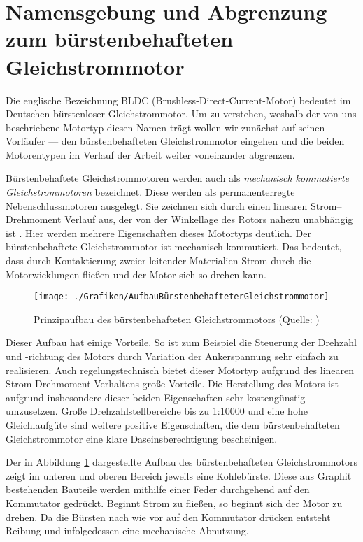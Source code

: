\section{Namensgebung und Abgrenzung zum bürstenbehafteten Gleichstrommotor}

Die englische Bezeichnung \glqq{}BLDC\grqq{} (Brushless-Direct-Current-Motor) bedeutet im Deutschen \glqq{}bürstenloser Gleichstrommotor\grqq{}. Um zu verstehen, weshalb der von uns beschriebene Motortyp diesen Namen trägt wollen wir zunächst auf seinen Vorläufer --- den bürstenbehafteten Gleichstrommotor eingehen und die beiden Motorentypen im Verlauf der Arbeit weiter voneinander abgrenzen.

Bürstenbehaftete Gleichstrommotoren werden auch als \emph{mechanisch kommutierte Gleichstrommotoren} bezeichnet. Diese \glqq{}werden als permanenterregte Nebenschlussmotoren ausgelegt. Sie zeichnen sich durch einen linearen Strom–Drehmoment Verlauf aus, der von der Winkellage des Rotors nahezu unabhängig ist\grqq{} \parencite[S.51]{Probst2011}. Hier werden mehrere Eigenschaften dieses Motortyps deutlich. Der bürstenbehaftete Gleichstrommotor ist mechanisch kommutiert. Das bedeutet, dass durch Kontaktierung zweier leitender Materialien Strom durch die Motorwicklungen fließen und der Motor sich so drehen kann.

\begin{figure}[H]
  \centering
  \texttt{[image: ./Grafiken/AufbauBürstenbehafteterGleichstrommotor]}
  \caption[Aufbau bürstenbehafteter Gleichstrommotor]{Prinzipaufbau des bürstenbehafteten Gleichstrommotors (Quelle: \parencite[S.51]{Probst2011})}
  \label{fig:AufbauBürstenbehaftet}
\end{figure}

Dieser Aufbau hat einige Vorteile. So ist zum Beispiel die Steuerung der Drehzahl und -richtung des Motors durch Variation der Ankerspannung sehr einfach zu realisieren. Auch regelungstechnisch bietet dieser Motortyp aufgrund des linearen Strom-Drehmoment-Verhaltens große Vorteile. Die Herstellung des Motors ist aufgrund insbesondere dieser beiden Eigenschaften sehr kostengünstig umzusetzen. \glqq{}Große Drehzahlstellbereiche bis zu 1:10000 und eine hohe Gleichlaufgüte\grqq{} \parencite[S.51]{Probst2011} sind weitere positive Eigenschaften, die dem bürstenbehafteten Gleichstrommotor eine klare Daseinsberechtigung bescheinigen.

Der in Abbildung \ref{fig:AufbauBürstenbehaftet} dargestellte Aufbau des bürstenbehafteten Gleichstrommotors zeigt im unteren und oberen Bereich jeweils eine Kohlebürste. Diese aus Graphit bestehenden Bauteile werden mithilfe einer Feder durchgehend auf den Kommutator gedrückt. Beginnt Strom zu fließen, so beginnt sich der Motor zu drehen. Da die Bürsten nach wie vor auf den Kommutator drücken entsteht Reibung und infolgedessen eine mechanische Abnutzung.

